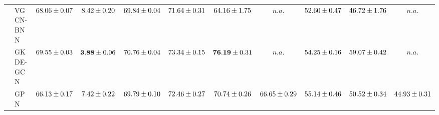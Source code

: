 \begin{table*}[!h]
{\begin{tabular}{ll|cc|cccc|ccc}
        & VGCN-BNN & ${68.06\tiny \pm 0.07}$ & ${8.42\tiny \pm 0.20}$ & ${69.84\tiny \pm 0.04}$ & ${71.64\tiny \pm 0.31}$ & ${64.16\tiny \pm 1.75}$ & $n.a.$ & ${52.60\tiny \pm 0.47}$ & ${46.72\tiny \pm 1.76}$ & $n.a.$\\
        & GKDE-GCN & ${69.55\tiny \pm 0.03}$ & ${\mathbf{3.88}\tiny \pm 0.06}$ & ${70.76\tiny \pm 0.04}$ & ${73.34\tiny \pm 0.15}$ & ${\mathbf{76.19}\tiny \pm 0.31}$ & $n.a.$ & ${54.25\tiny \pm 0.16}$ & ${59.07\tiny \pm 0.42}$ & $n.a.$\\
        & GPN & ${66.13\tiny \pm 0.17}$ & ${7.42\tiny \pm 0.22}$ & ${69.79\tiny \pm 0.10}$ & ${72.46\tiny \pm 0.27}$ & ${70.74\tiny \pm 0.26}$ & ${{66.65}\tiny \pm 0.29}$ & ${55.14\tiny \pm 0.46}$ & ${50.52\tiny \pm 0.34}$ & ${{44.93}\tiny \pm 0.31}$\\

        \midrule
        

\end{tabular}}
\end{table*}
